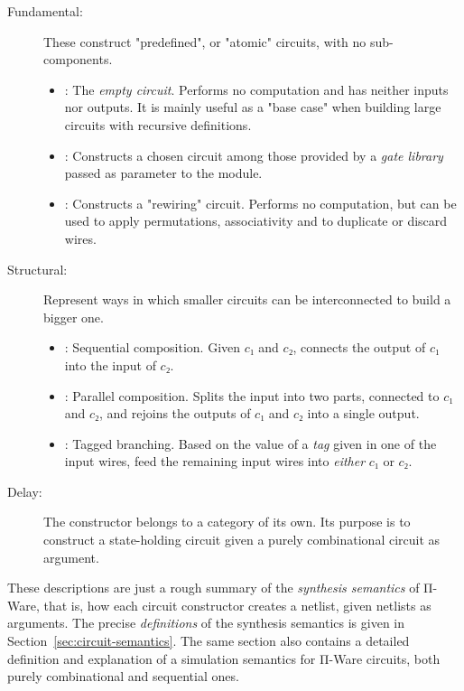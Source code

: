         \begin{description}
            \item[Fundamental:] These construct "predefined", or "atomic" circuits, with no sub-components.
                \begin{itemize}
                    \item {}: The \emph{empty circuit}. Performs no computation and has neither inputs nor outputs.
                        It is mainly useful as a "base case" when building large circuits with recursive definitions.
                    \item {}: Constructs a chosen circuit among those provided by a \emph{gate library}
                        passed as parameter to the  module.
                    \item {}: Constructs a "rewiring" circuit. Performs no computation,
                        but can be used to apply permutations, associativity and to duplicate or discard wires.
                \end{itemize}
            \item[Structural:] Represent ways in which smaller circuits can be interconnected to build a bigger one.
                \begin{itemize}
                    \item {}: Sequential composition.
                        Given $c₁$ and $c₂$, connects the output of $c₁$ into the input of $c₂$.
                    \item {}: Parallel composition.
                        Splits the input into two parts, connected to $c₁$ and $c₂$,
                        and rejoins the outputs of $c₁$ and $c₂$ into a single output.
                    \item {}: Tagged branching.
                        Based on the value of a \emph{tag} given in one of the input wires,
                        feed the remaining input wires into \emph{either} $c₁$ or $c₂$.
                \end{itemize}
            \item[Delay:]
                The  constructor belongs to a category of its own.
                Its purpose is to construct a state-holding circuit given a purely combinational circuit as argument.
        \end{description}

        These descriptions are just a rough summary of the \emph{synthesis semantics} of Π-Ware, that is,
        how each circuit constructor creates a netlist, given netlists as arguments.
        The precise \emph{definitions} of the synthesis semantics is given in Section~\ref{sec:circuit-semantics}.
        The same section also contains a detailed definition and explanation of a simulation semantics
        for Π-Ware circuits, both purely combinational and sequential ones.

